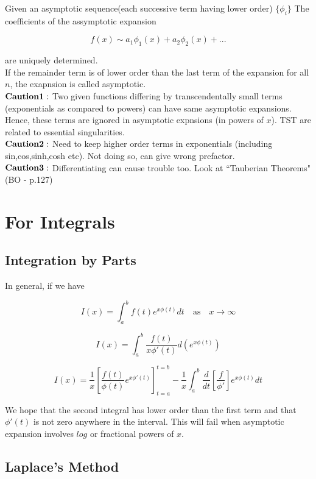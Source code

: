 \documentclass{report}
\begin{document}
\noindent Given an asymptotic sequence(each successive term having lower order) $\{\phi_i\}$ The coefficients of the assymptotic expansion 

$$ f(x) \sim a_1\phi_1(x) + a_2\phi_2(x) + ... $$

\noindent are uniquely determined.\\

\noindent If the remainder term is of lower order than the last term of the expansion for all $n$, the exapnsion is called asymptotic.\\

\noindent $\bold{Caution 1:}$ Two given functions differing by transcendentally small terms (exponentials as compared to powers) can have same asymptotic expansions. Hence, these terms are ignored in asymptotic expnsions (in powers of $x$). TST are related to essential singularities.\\

\noindent $\bold {Caution 2:}$ Need to keep higher order terms in exponentials (including sin,cos,sinh,cosh etc). Not doing so, can give wrong prefactor.\\

\noindent $\bold{Caution 3:}$ Differentiating can cause trouble too. Look at ``Tauberian Theorems" (BO - p.127)

\section{For Integrals}

\subsection{Integration by Parts}

\noindent In general, if we have

$$I(x) = \int_{a}^{b} f(t) e^{x\phi(t)} dt \quad\mathrm{as}\quad x\to\infty$$ 

$$I(x) = \int_{a}^{b} \frac{f(t)}{x\phi'(t)} d(e^{x\phi(t)})$$

$$I(x) = \frac{1}{x} \left[\frac{f(t)}{\phi(t)} e^{x\phi'(t)}\right]_{t=a}^{t=b} - \frac{1}{x}\int_{a}^{b}\frac {d}{dt}\left[\frac{f}{\phi'}\right]e^{x\phi(t)}dt $$

We hope that the second integral has lower order than the first term and that $\phi'(t)$ is not zero anywhere in the interval. This will fail when asymptotic expansion involves $log$ or fractional powers of $x$.

\subsection{Laplace's Method}
\end{document}
